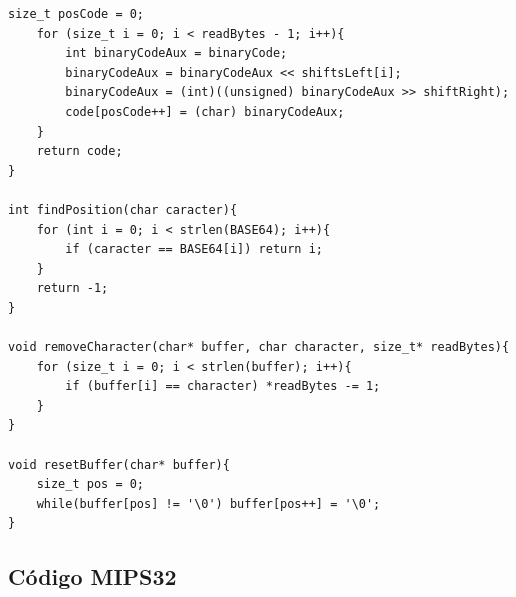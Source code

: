 \documentclass[titlepage,a4paper]{article}
\begin{document}
\begin{lstlisting}[style=customC]
	size_t posCode = 0;
	for (size_t i = 0; i < readBytes - 1; i++){
		int binaryCodeAux = binaryCode;
		binaryCodeAux = binaryCodeAux << shiftsLeft[i];
		binaryCodeAux = (int)((unsigned) binaryCodeAux >> shiftRight);
		code[posCode++] = (char) binaryCodeAux;
	}
	return code;
}

int findPosition(char caracter){
	for (int i = 0; i < strlen(BASE64); i++){
		if (caracter == BASE64[i]) return i;
	}
	return -1;
}

void removeCharacter(char* buffer, char character, size_t* readBytes){
	for (size_t i = 0; i < strlen(buffer); i++){
		if (buffer[i] == character) *readBytes -= 1;
	}
}

void resetBuffer(char* buffer){
	size_t pos = 0;
	while(buffer[pos] != '\0') buffer[pos++] = '\0';
}
\end{lstlisting}


\subsection{Código MIPS32}
\label{apendice:codigo_assembly}

\end{document}
